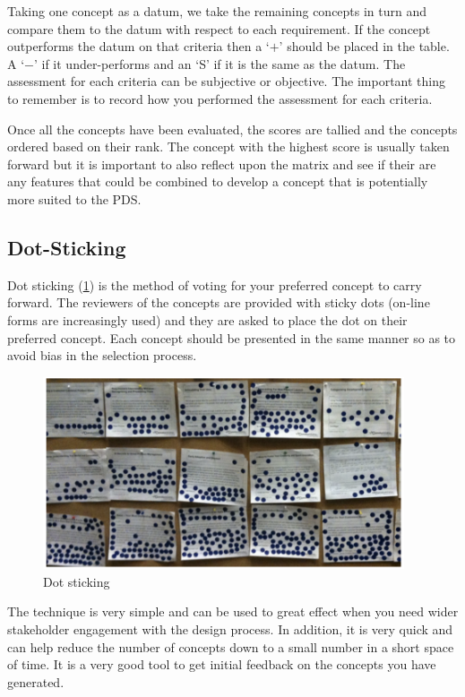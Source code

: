 Taking one concept as a datum, we take the remaining concepts in turn and compare them to the datum with respect to each requirement. If the concept outperforms the datum on that criteria then a `$+$' should be placed in the table. A `$-$' if it under-performs and an `S' if it is the same as the datum. The assessment for each criteria can be subjective or objective. The important thing to remember is to record how you performed the assessment for each criteria.

Once all the concepts have been evaluated, the scores are tallied and the concepts ordered based on their rank. The concept with the highest score is usually taken forward but it is important to also reflect upon the matrix and see if their are any features that could be combined to develop a concept that is potentially more suited to the \ac{PDS}.

\subsection{Dot-Sticking}

Dot sticking (\cref{fig-dot}) is the method of voting for your preferred concept to carry forward. The reviewers of the concepts are provided with sticky dots (on-line forms are increasingly used) and they are asked to place the dot on their preferred concept. Each concept should be presented in the same manner so as to avoid bias in the selection process.

\begin{figure}[h!]
\centering
\includegraphics[width=0.95\textwidth]{figs/dot-sticking.png}
\caption{Dot sticking}
\label{fig-dot}
\end{figure}

The technique is very simple and can be used to great effect when you need wider stakeholder engagement with the design process. In addition, it is very quick and can help reduce the number of concepts down to a small number in a short space of time. It is a very good tool to get initial feedback on the concepts you have generated.

